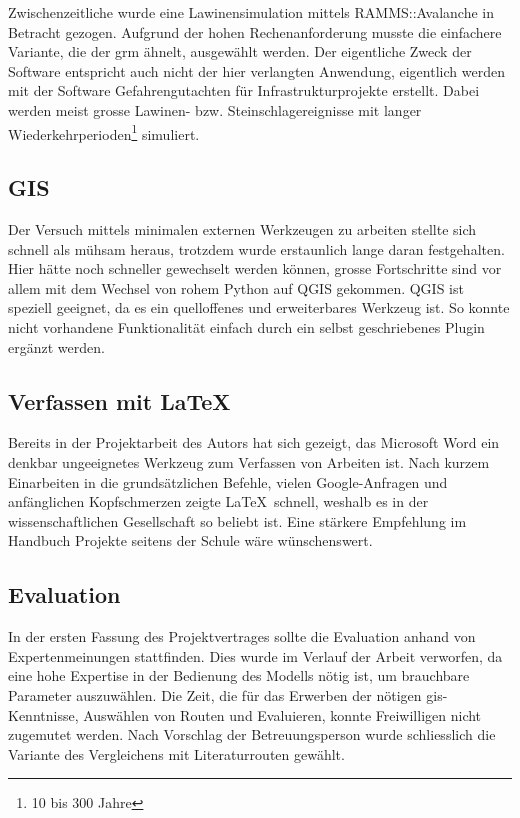 Zwischenzeitliche wurde eine Lawinensimulation mittels RAMMS::Avalanche in Betracht gezogen. Aufgrund der hohen Rechenanforderung musste die einfachere Variante, die der \gls{grm} ähnelt, ausgewählt werden. Der eigentliche Zweck der Software entspricht auch nicht der hier verlangten Anwendung, eigentlich werden mit der Software Gefahrengutachten für Infrastrukturprojekte erstellt. Dabei werden meist grosse Lawinen- bzw. Steinschlagereignisse mit langer Wiederkehrperioden\footnote{10 bis 300 Jahre} simuliert. 





\subsection{GIS}

Der Versuch mittels minimalen externen Werkzeugen zu arbeiten stellte sich schnell als mühsam heraus, trotzdem wurde erstaunlich lange daran festgehalten. Hier hätte noch schneller gewechselt werden können, grosse Fortschritte sind vor allem mit dem Wechsel von rohem Python auf QGIS gekommen. QGIS ist speziell geeignet, da es ein quelloffenes und erweiterbares Werkzeug ist. So konnte nicht vorhandene Funktionalität einfach durch ein selbst geschriebenes Plugin ergänzt werden.

\subsection{Verfassen mit \LaTeX}
Bereits in der Projektarbeit des Autors hat sich gezeigt, das Microsoft Word ein denkbar ungeeignetes Werkzeug zum Verfassen von Arbeiten ist. Nach kurzem Einarbeiten in die grundsätzlichen Befehle, vielen Google-Anfragen und anfänglichen Kopfschmerzen zeigte \LaTeX\ schnell, weshalb es in der wissenschaftlichen Gesellschaft so beliebt ist. Eine stärkere Empfehlung im Handbuch Projekte seitens der Schule wäre wünschenswert.

\subsection{Evaluation}

In der ersten Fassung des Projektvertrages sollte die Evaluation anhand von Expertenmeinungen stattfinden. Dies wurde im  Verlauf der Arbeit verworfen, da eine hohe Expertise in der Bedienung des Modells nötig ist, um brauchbare Parameter auszuwählen. Die Zeit, die für das Erwerben der nötigen \gls{gis}-Kenntnisse, Auswählen von Routen und Evaluieren, konnte Freiwilligen nicht zugemutet werden. Nach Vorschlag der Betreuungsperson wurde schliesslich die Variante des Vergleichens mit Literaturrouten gewählt.

